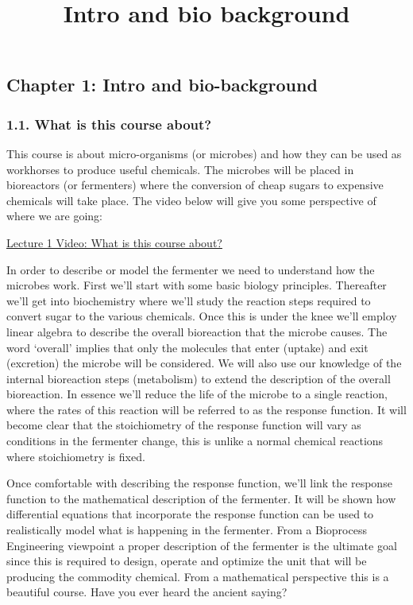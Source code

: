 \documentclass[11pt]{article}
\title{Intro and bio background}
\begin{document}
    
    
    \maketitle
    
    

    
    \subsection{Chapter 1: Intro and
bio-background}\label{chapter-1-intro-and-bio-background}

\subsubsection{1.1. What is this course
about?}\label{what-is-this-course-about}

This course is about micro-organisms (or microbes) and how they can be
used as workhorses to produce useful chemicals. The microbes will be
placed in bioreactors (or fermenters) where the conversion of cheap
sugars to expensive chemicals will take place. The video below will give
you some perspective of where we are going:

\href{http://www.youtube.com/watch?v=Ur6SfJ-u1CU}{Lecture 1 Video: What
is this course about?}

In order to describe or model the fermenter we need to understand how
the microbes work. First we'll start with some basic biology principles.
Thereafter we'll get into biochemistry where we'll study the reaction
steps required to convert sugar to the various chemicals. Once this is
under the knee we'll employ linear algebra to describe the overall
bioreaction that the microbe causes. The word `overall' implies that
only the molecules that enter (uptake) and exit (excretion) the microbe
will be considered. We will also use our knowledge of the internal
bioreaction steps (metabolism) to extend the description of the overall
bioreaction. In essence we'll reduce the life of the microbe to a single
reaction, where the rates of this reaction will be referred to as the
response function. It will become clear that the stoichiometry of the
response function will vary as conditions in the fermenter change, this
is unlike a normal chemical reactions where stoichiometry is fixed.

Once comfortable with describing the response function, we'll link the
response function to the mathematical description of the fermenter. It
will be shown how differential equations that incorporate the response
function can be used to realistically model what is happening in the
fermenter. From a Bioprocess Engineering viewpoint a proper description
of the fermenter is the ultimate goal since this is required to design,
operate and optimize the unit that will be producing the commodity
chemical. From a mathematical perspective this is a beautiful course.
Have you ever heard the ancient saying?
\end{document}
